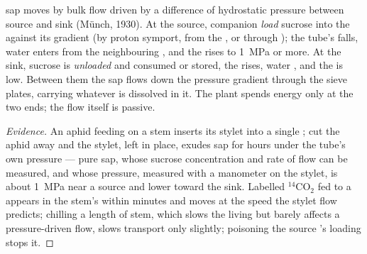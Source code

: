 \begin{theorem}\label{thm:b1:plant-transport:pressureflow}
 sap moves by bulk flow driven by a difference of hydrostatic
pressure between source and sink (Münch, 1930). At the source,
companion  \emph{load} sucrose into the  against its
gradient (by proton symport, from the , or through
); the tube's  falls, water enters from
the neighbouring , and the  rises to \qty{1}{MPa} or more.
At the sink, sucrose is \emph{unloaded} and consumed or stored, the
 rises, water , and the  is low. Between
them the sap flows down the pressure gradient through the sieve
plates, carrying whatever is dissolved in it. The plant spends energy
only at the two ends; the flow itself is passive.
\end{theorem}
\begin{proof}[Evidence]
An aphid feeding on a stem inserts its stylet into a single ; cut the aphid away and the stylet, left in place, exudes sap for
hours under the tube's own pressure --- pure  sap, whose sucrose
concentration and rate of flow can be measured, and whose pressure,
measured with a manometer on the stylet, is about \qty{1}{MPa} near a
source and lower toward the sink. Labelled $\mathrm{^{14}CO_2}$ fed to
a  appears in the stem's  within minutes and moves at the
speed the stylet flow predicts; chilling a length of stem, which
slows the living  but barely affects a pressure-driven flow,
slows transport only slightly; poisoning the source 's loading
stops it.
\end{proof}

